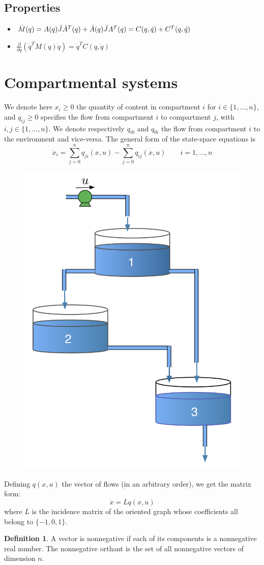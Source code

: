 \documentclass[12pt, openany]{report}
\theoremstyle{definition}
\newtheorem{definition}[thm]{Definition}
\begin{document}
\subsection{Properties}
\begin{itemize}
    \item $\dot M(q) = A(q)\Bar J\dot A^T(q) + \dot A(q)\bar JA^T(q)=C(q,\dot q)+C^T(q,\dot q)$
    \item $\frac{\partial }{\partial q}(\dot q^TM(q)\dot q)=\dot q^TC(q,\dot q)$
\end{itemize}
\section{Compartmental systems}
We denote here $x_i\ge 0$ the quantity of content in compartment $i$ for $i\in\{1,\dots,n\}$, and $q_{ij}\ge 0$ specifies the flow from compartment $i$ to compartment $j$, with $i,j\in\{1,\dots,n\}$. We denote respectively $q_{i0}$ and $q_{0i}$ the flow from compartment $i$ to the environment and vice-versa. The general form of the state-space equations is 
\begin{equation}
    \dot x_i = \sum_{j=0}^n q_{ji}(x,u) - \sum_{j=0}^n q_{ij}(x,u)\qquad i = 1,\dots,n 
\end{equation}
\begin{figure}[H]
    \centering
    \includegraphics[width = .3\textwidth]{img/compartment.png}
\end{figure}
Defining $q(x,u)$ the vector of flows (in an arbitrary order), we get the matrix form:
\begin{equation}
    \dot x= Lq(x,u)
\end{equation}
where $L$ is the incidence matrix of the oriented graph whose coefficients all belong to $\{-1,0,1\}$. 
\begin{definition}
    A vector is nonnegative if each of its components is a nonnegative real number. The nonnegative orthant is the set of all nonnegative vectors of dimension $n$.
\end{definition}
\end{document}

